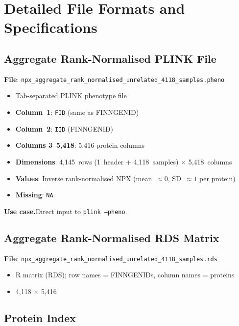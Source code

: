 \documentclass[11pt,a4paper]{article}
\begin{document}
\section{Detailed File Formats and Specifications}
\label{sec:detailed_formats}

\subsection{Aggregate Rank-Normalised PLINK File}

\textbf{File}: \texttt{npx\_aggregate\_rank\_normalised\allowbreak\_unrelated\_4118\_samples.pheno}

\begin{itemize}
  \item Tab-separated PLINK phenotype file
  \item \textbf{Column~1}: \texttt{FID} (same as FINNGENID)
  \item \textbf{Column~2}: \texttt{IID} (FINNGENID)
  \item \textbf{Columns 3--5,418}: 5,416 protein columns
  \item \textbf{Dimensions}: 4,145~rows
        (1~header + 4,118~samples) $\times$ 5,418~columns
  \item \textbf{Values}: Inverse rank-normalised NPX
        (mean~$\approx 0$, SD~$\approx 1$ per protein)
  \item \textbf{Missing}: \texttt{NA}
\end{itemize}

\textbf{Use case.}\enspace Direct input to \texttt{plink --pheno}.

\subsection{Aggregate Rank-Normalised RDS Matrix}

\textbf{File}: \texttt{npx\_aggregate\_rank\_normalised\allowbreak\_unrelated\_4118\_samples.rds}

\begin{itemize}
  \item R matrix (RDS); row names = FINNGENIDs, column names = proteins
  \item 4,118 $\times$ 5,416
\end{itemize}

\subsection{Protein Index}
\end{document}
